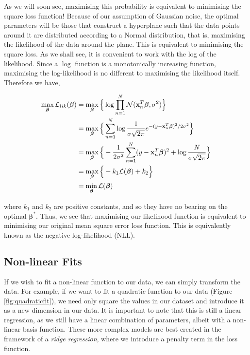 \documentclass[11pt]{amsart}
\begin{document}
As we will soon see, maximising this probability is equivalent to minimising the square loss function! Because of our assumption of Gaussian noise, the optimal parameters will be those that construct a hyperplane such that the data points around it are distributed according to a Normal distribution, that is, maximising the likelihood of the data around the plane. This is equivalent to minimising the square loss. As we shall see, it is convenient to work with the log of the likelihood. Since a $\log$ function is a monotonically increasing function, maximising the log-likelihood is no different to maximising the likelihood itself. Therefore we have,

\begin{align}
\max_{\boldsymbol\beta}\mathcal{L}_{lik}(\boldsymbol\beta) &= \max_{\boldsymbol\beta}\Big\{\log \prod_{n=1}^N \mathcal{N}(\mathbf{x}_n^T\boldsymbol\beta, \sigma^2)\Big\} \notag \\
&=\max_{\boldsymbol\beta}\Big\{\sum_{n=1}^N \log \frac{1}{\sigma\sqrt{2\pi}}e^{-(y - \mathbf{x}_n^T\boldsymbol\beta)^2/2\sigma^2}\Big\} \notag \\
&=\max_{\boldsymbol\beta}\Big\{-\frac{1}{2\sigma^2}\sum_{n=1}^N (y - \mathbf{x}_n^T\boldsymbol\beta)^2 + \log\frac{N}{\sigma\sqrt{2\pi}}\Big\} \notag \\
&=\max_{\boldsymbol\beta}\Big\{-k_1\mathcal{L}(\boldsymbol\beta) + k_2\Big\} \notag \\
&=\min_{\boldsymbol\beta}\mathcal{L}(\boldsymbol\beta)\notag
\end{align}

where $k_1$ and $k_2$ are positive constants, and so they have no bearing on the optimal $\boldsymbol\beta^*$. Thus, we see that maximising our likelihood function is equivalent to minimising our original mean square error loss function. This is equivalently known as the negative log-likelihood (NLL).

\subsection{Non-linear Fits}

If we wish to fit a non-linear function to our data, we can simply transform the data. For example, if we want to fit a quadratic function to our data (Figure \ref{fig:quadraticfit}), we need only square the values in our dataset and introduce it as a new dimension in our data. It is important to note that this is still a linear regression, as we still have a linear combination of parameters, albeit with a non-linear basis function. These more complex models are best created in the framework of a \emph{ridge regression}, where we introduce a penalty term in the loss function.
\end{document}
